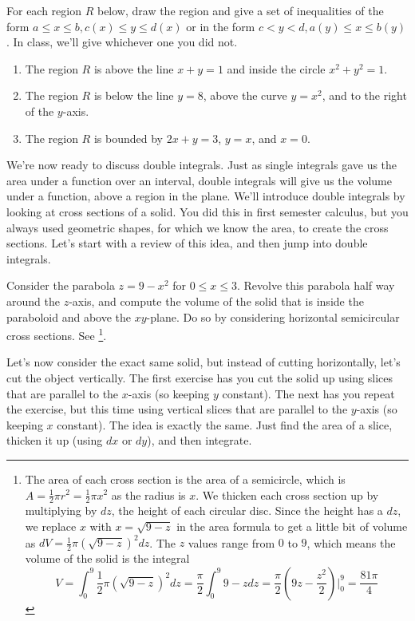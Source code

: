 \begin{problem}
For each region $R$ below, draw the region and give a set of inequalities of the form $a\leq x\leq b, c(x)\leq y\leq d(x)$ or in the form $c<y<d, a(y)\leq x\leq b(y)$. In class, we'll give whichever one you did not. 
\begin{enumerate}
 \item The region $R$ is above the line $x+y=1$ and inside the circle $x^2+y^2=1$.
 \item The region $R$ is below the line $y=8$, above the curve $y=x^2$, and to the right of the $y$-axis.
 \item The region $R$ is bounded by $2x+y=3$, $y=x$, and $x=0$. 
\end{enumerate}
\end{problem}

We're now ready to discuss double integrals. Just as single integrals gave us the area under a function over an interval, double integrals will give us the volume under a function, above a region in the plane.  We'll introduce double integrals by looking at cross sections of a solid.  You did this in first semester calculus, but you always used geometric shapes, for which we know the area, to create the cross sections.  Let's start with a review of this idea, and then jump into double integrals.




\begin{review*}
 Consider the parabola $z=9-x^2$ for $0\leq x\leq 3$. Revolve this parabola half way around the $z$-axis, and compute the volume of the solid that is inside the paraboloid and above the $xy$-plane.  Do so by considering horizontal semicircular cross sections. See \footnote{
The area of each cross section is the area of a semicircle, which is $A=\frac{1}{2}\pi r^2 = \frac12 \pi x^2$ as the radius is $x$. We thicken each cross section up by multiplying by $dz$, the height of each circular disc. Since the height has a $dz$, we replace $x$ with $x=\sqrt{9-z}$ in the area formula to get a little bit of volume as $dV = \frac{1}{2}\pi (\sqrt{9-z})^2 dz$.  The $z$ values range from $0$ to $9$, which means the volume of the solid is the integral 
$$V
=\int_0^9 \frac{1}{2}\pi (\sqrt{9-z})^2 dz
=\frac{\pi}{2}\int_0^9  9-z dz
=\frac{\pi}{2}  \left(9z-\frac{z^2}{2}\right)\bigg|_0^9
=\frac{81\pi}{4}
$$}.
\end{review*}



Let's now consider the exact same solid, but instead of cutting horizontally, let's cut the object vertically.  The first exercise has you cut the solid up using slices that are parallel to the $x$-axis (so keeping $y$ constant).  The next has you repeat the exercise, but this time using vertical slices that are parallel to the $y$-axis (so keeping $x$ constant).  The idea is exactly the same.  Just find the area of a slice, thicken it up (using $dx$ or $dy$), and then integrate.  



